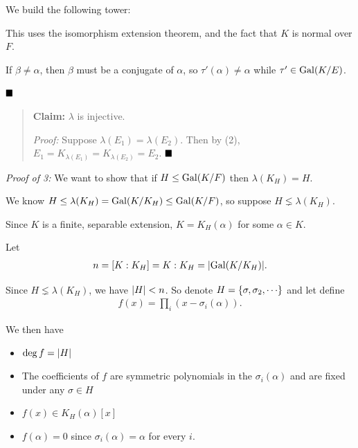 We build the following tower:


This uses the isomorphism extension theorem, and the fact that \(K\) is
normal over \(F\).

If \(\beta\neq \alpha\), then \(\beta\) must be a conjugate of
\(\alpha\), so \(\tau'(\alpha) \neq \alpha\) while
\(\tau' \in \mathrm{Gal}(K/E)\).

\(\qed\)

\begin{quote}
\textbf{Claim:} \(\lambda\) is injective.

\emph{Proof:} Suppose \(\lambda(E_1) = \lambda(E_2)\). Then by (2),
\(E_1 = K_{\lambda(E_1)} = K_{\lambda(E_2)} = E_2\). \(\qed\)
\end{quote}

\emph{Proof of 3:} We want to show that if \(H\leq \mathrm{Gal}(K/F)\) then
\(\lambda(K_H) = H\).

We know \(H \leq \lambda(K_H) = \mathrm{Gal}(K/K_H) \leq \mathrm{Gal}(K/F)\), so suppose
\(H \lneq \lambda(K_H)\).

Since \(K\) is a finite, separable extension, \(K = K_H(\alpha)\) for
some \(\alpha \in K\).

Let \begin{align*}
n = [K: K_H] = {K: K_H} = {\left\lvert {\mathrm{Gal}(K/K_H)} \right\rvert}
.\end{align*}

Since \(H \lneq \lambda(K_H)\), we have \({\left\lvert {H} \right\rvert} < n\). So denote
\(H = \left\{{\sigma, \sigma_2, \cdots}\right\}\) and let define \begin{align*}
f(x) = \prod_i (x - \sigma_i(\alpha))
.\end{align*}

We then have

\begin{itemize}
\item
  \(\deg f = {\left\lvert {H} \right\rvert}\)
\item
  The coefficients of \(f\) are symmetric polynomials in the
  \(\sigma_i(\alpha)\) and are fixed under any \(\sigma\in H\)
\item
  \(f(x) \in K_H(\alpha)[x]\)
\item
  \(f(\alpha) = 0\) since \(\sigma_i(\alpha) = \alpha\) for every \(i\).
\end{itemize}

